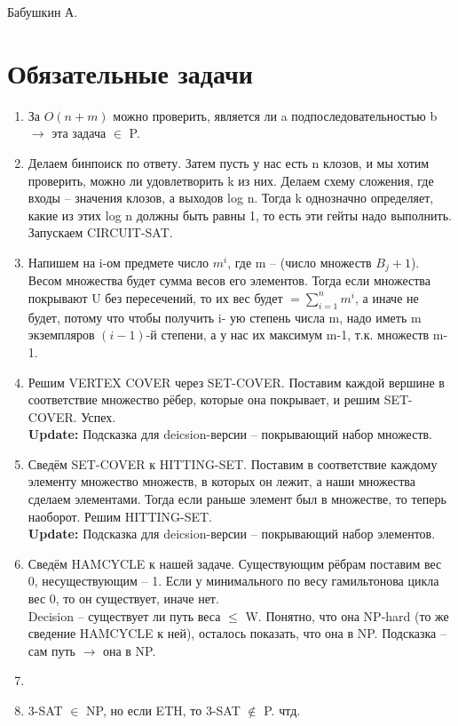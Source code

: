 \documentclass[12pt]{article}
\begin{document}
\def\t{\texttt}

Бабушкин А.

\section{Обязательные задачи}

\begin{enumerate}
	\setlength{\parskip}{0pt} 
	\setlength{\itemsep}{0pt} 
	\item За $O(n + m)$ можно проверить, является ли a подпоследовательностью b $\to$ эта задача $\in$ P. \\
    \item Делаем бинпоиск по ответу. Затем пусть у нас есть n клозов, и мы хотим проверить, можно ли удовлетворить k из них. 
    Делаем схему сложения, где входы -- значения клозов, а выходов log n. Тогда k однозначно определяет, какие из этих log n должны 
    быть равны 1, то есть эти гейты надо выполнить. Запускаем CIRCUIT-SAT. \\
    \item Напишем на i-ом предмете число $m^i$, где m -- (число множеств $B_j + 1$). Весом множества будет сумма весов его элементов. Тогда 
    если множества покрывают U без пересечений, то их вес будет $= \sum_{i = 1}^n m^i$, а иначе не будет, потому что чтобы получить i-
    ую степень числа m, надо иметь m экземпляров $(i{-}1)$-й степени, а у нас их максимум m-1, т.к. множеств m-1. \\
    \item Решим VERTEX COVER через SET-COVER. Поставим каждой вершине в соответствие множество рёбер, которые она покрывает, и 
    решим SET-COVER. Успех.\\
    \textbf{Update:} Подсказка для deicsion-версии -- покрывающий набор множеств. \\
    \item Сведём SET-COVER к HITTING-SET. Поставим в соответствие каждому элементу множество множеств, в которых он лежит, а наши множества 
    сделаем элементами. Тогда если раньше элемент был в множестве, то теперь наоборот. Решим HITTING-SET. \\
    \textbf{Update:} Подсказка для deicsion-версии -- покрывающий набор элементов. \\
    \item Сведём HAMCYCLE к нашей задаче. Существующим рёбрам поставим вес 0, несуществующим -- 1. Если у минимального по весу 
    гамильтонова цикла вес 0, то он существует, иначе нет. \\
    Decision -- существует ли путь веса $\le$ W. Понятно, что она NP-hard (то же сведение HAMCYCLE к ней), осталось показать, что она в 
    NP. Подсказка -- сам путь $\to$ она в NP. \\
    \item ~\\
    \item 3-SAT $\in$ NP, но если ETH, то 3-SAT $\notin$ P. чтд. \\
\end{enumerate}
\end{document}
